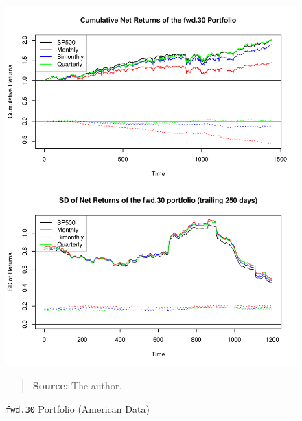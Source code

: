 \documentclass[preprint, doubleblind, authoryear,10pt]{elsarticle}
\begin{document}
\begin{figure}[htpb]
\centering
\footnotesize
\caption{\texttt{fwd.30} Portfolio (American Data)}
\label{fig:spy:fwd.30}
\includegraphics[width=.95\linewidth]{./figs/SP500-retac-fwd-30.pdf}
\begin{quote}
\textbf{Source:} The author.
\end{quote}
\end{figure}
\end{document}
